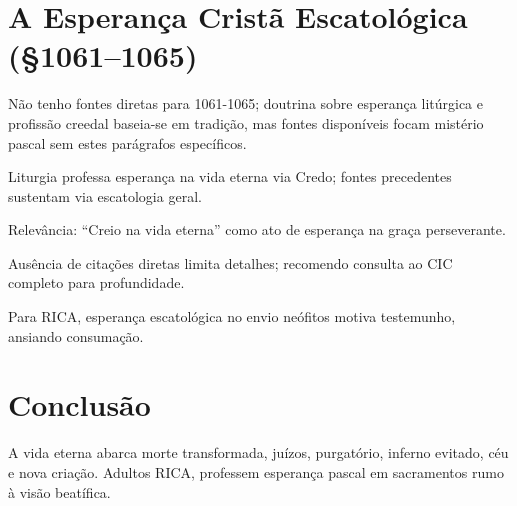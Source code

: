 \section{A Esperança Cristã Escatológica (\S 1061--1065)}

Não tenho fontes diretas para 1061-1065; doutrina sobre esperança litúrgica e profissão creedal baseia-se em tradição, mas fontes disponíveis focam mistério pascal sem estes parágrafos específicos.

Liturgia professa esperança na vida eterna via Credo; fontes precedentes sustentam via escatologia geral.

Relevância: ``Creio na vida eterna'' como ato de esperança na graça perseverante.

Ausência de citações diretas limita detalhes; recomendo consulta ao CIC completo para profundidade.

Para RICA, esperança escatológica no envio neófitos motiva testemunho, ansiando consumação.

\section{Conclusão}

A vida eterna abarca morte transformada, juízos, purgatório, inferno evitado, céu e nova criação. Adultos RICA, professem esperança pascal em sacramentos rumo à visão beatífica.